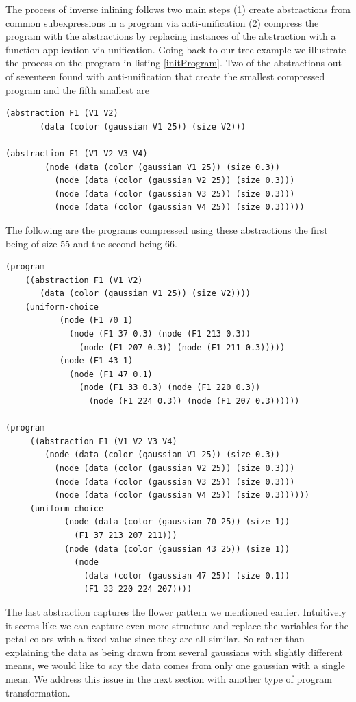 \documentclass[a4paper,10pt]{article}
\begin{document}
The process of inverse inlining follows two main steps (1) create abstractions from common subexpressions in a program via anti-unification (2) compress the program with the abstractions by replacing instances of the abstraction with a function application via unification.  Going back to our tree example we illustrate the process on the program in listing \ref{initProgram}.
Two of the abstractions out of seventeen found with anti-unification that create the smallest compressed program and the fifth smallest are 
\begin{lstlisting}
(abstraction F1 (V1 V2)
       (data (color (gaussian V1 25)) (size V2)))

(abstraction F1 (V1 V2 V3 V4)
        (node (data (color (gaussian V1 25)) (size 0.3))
          (node (data (color (gaussian V2 25)) (size 0.3)))
          (node (data (color (gaussian V3 25)) (size 0.3)))
          (node (data (color (gaussian V4 25)) (size 0.3)))))
\end{lstlisting}
The following are the programs compressed using these abstractions the first being of size 55 and the second being 66.
\begin{lstlisting}
(program
    ((abstraction F1 (V1 V2)
       (data (color (gaussian V1 25)) (size V2))))
    (uniform-choice
           (node (F1 70 1)
             (node (F1 37 0.3) (node (F1 213 0.3))
               (node (F1 207 0.3)) (node (F1 211 0.3)))))
           (node (F1 43 1)
             (node (F1 47 0.1)
               (node (F1 33 0.3) (node (F1 220 0.3))
                 (node (F1 224 0.3)) (node (F1 207 0.3))))))

(program
     ((abstraction F1 (V1 V2 V3 V4)
        (node (data (color (gaussian V1 25)) (size 0.3))
          (node (data (color (gaussian V2 25)) (size 0.3)))
          (node (data (color (gaussian V3 25)) (size 0.3)))
          (node (data (color (gaussian V4 25)) (size 0.3))))))
     (uniform-choice
            (node (data (color (gaussian 70 25)) (size 1))
              (F1 37 213 207 211)))
            (node (data (color (gaussian 43 25)) (size 1))
              (node
                (data (color (gaussian 47 25)) (size 0.1))
                (F1 33 220 224 207))))
\end{lstlisting}
The last abstraction captures the flower pattern we mentioned earlier.  Intuitively it seems like we can capture even more structure and replace the variables for the petal colors with a fixed value since they are all similar.  So rather than explaining the data as being drawn from several gaussians with slightly different means, we would like to say the data comes from only one gaussian with a single mean.  We address this issue in the next section with another type of program transformation.
\end{document}
